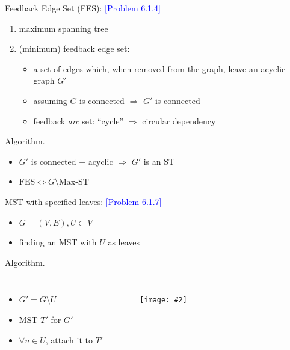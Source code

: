 \documentclass{beamer}
\newcommand{\problemno}[1]{\textcolor{blue}{\scriptsize [Problem #1]}}
\newcommand{\fignocaption}[2]
{
  \begin{figure}[htp]
    \centering
      \texttt{[image: \#2]}
  \end{figure}
}
\begin{document}
\begin{frame}{}
  \begin{block}{Feedback Edge Set (FES): \problemno{6.1.4}}
	\begin{enumerate}
	  \item maximum spanning tree
	  \item (minimum) feedback edge set:
	    \begin{itemize}
	      \item a set of edges which, when removed from the graph, leave an acyclic
	      graph $G'$
	      \item assuming $G$ is connected $\Rightarrow$ $G'$ is connected
	      \item feedback \emph{arc} set: ``cycle'' $\Rightarrow$ circular
	      dependency
	    \end{itemize}
	\end{enumerate}
  \end{block}

  \begin{block}{Algorithm.}
  \begin{itemize}
    \item $G'$ is connected + acyclic $\Rightarrow$ $G'$ is an ST
    \item $\textrm{FES} \Leftrightarrow G \setminus \textrm{Max-ST}$
  \end{itemize}
  \end{block}
\end{frame}
\begin{frame}{}
  \begin{block}{MST with specified leaves: \problemno{6.1.7}}
    \begin{itemize}
      \item $G = (V, E), U \subset V$
      \item finding an MST with $U$ as leaves
    \end{itemize}
  \end{block}

  \begin{block}{Algorithm.}
    \begin{columns}
	    \begin{itemize}
	      \item $G' = G \setminus U$
	      \item MST $T'$ for $G'$
	      \item $\forall u \in U$, attach it to $T'$
	    \end{itemize}
  		\fignocaption{width = 0.50\textwidth}{fig/mst-specified-leaves.pdf}
    \end{columns}
  \end{block}
\end{frame}
\end{document}
